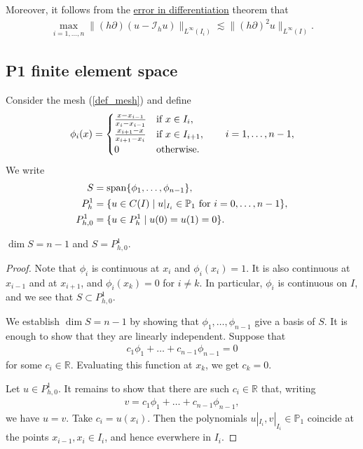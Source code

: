 \documentclass[12pt,oneside]{amsart}
\def\R{\mathbb R}
\def\I{\mathcal I}
\DeclareMathOperator{\linspan}{span}
\begin{document}
Moreover, it follows from the \href{https://nbviewer.org/github/uh-comp-methods1/notebooks/blob/main/interpolation/lecture.ipynb#Theorem:-error-in-differentiation}{error in differentiation} theorem that 
    \begin{align}\label{eq_err_in_diff}
\max_{i=1,\dots,n}\|(h\partial)(u - \I_h u)\|_{L^\infty(I_i)} \lesssim \|(h \partial)^2 u\|_{L^\infty(I)}.
    \end{align}

\subsection{P1 finite element space}

Consider the mesh (\ref{def_mesh}) and define 
    \begin{align}\label{def_P1_basis}
\phi_i(x) = \begin{cases}
\frac{x - x_{i-1}}{x_i - x_{i-1}} & \textnormal{if $x \in I_i$},
\\
\frac{x_{i+1} - x}{x_{i+1} - x_i} & \textnormal{if $x \in I_{i+1}$},
\\
0 & \textnormal{otherwise}.
\end{cases}
\qquad i = 1,\dots,n-1,
    \end{align}
We write
    \begin{align}\label{def_S}
S &= \linspan \{ \phi_1,\dots,\phi_{n-1} \},
\\\notag
P^1_{h} &= \{ u \in C(I) \mid \textnormal{$u|_{I_{i}} \in \mathbb P_1$ for $i=0,\dots,n-1$} \},
\\\notag
P^1_{h,0} &= \{ u \in P^1_{h} \mid u(0) = u(1) = 0 \}.
    \end{align}

\begin{lemma}
$\dim S = n-1$ and $S = P^1_{h,0}$.
\end{lemma}
\begin{proof}
Note that $\phi_i$ is continuous at $x_i$ and $\phi_i(x_i) = 1$.
It is also continuous at $x_{i-1}$ and at $x_{i+1}$,
and $\phi_i(x_k) = 0$ for $i \ne k$. In particular, $\phi_i$ is continuous on $I$, and we see that $S \subset P_{h,0}^1$.

We establish $\dim S = n - 1$ by showing that $\phi_1,\dots,\phi_{n-1}$ give a basis of $S$.
It is enough to show that they are linearly independent.
Suppose that 
    \begin{align*}
c_1 \phi_1 + \dots + c_{n-1} \phi_{n-1} = 0
    \end{align*}
for some $c_i \in \R$. Evaluating this function at $x_k$, we get 
$c_k = 0$.

Let $u \in P^1_{h,0}$. It remains to show that there are such $c_i \in \R$ that, writing
    \begin{align*}
v = c_1 \phi_1 + \dots + c_{n-1} \phi_{n-1},
    \end{align*}
we have $u = v$. 
Take $c_i = u(x_i)$. Then 
the polynomials
$u|_{I_i}, v|_{I_i} \in \mathbb P_1$ 
coincide at the points $x_{i-1}, x_i \in I_i$, and hence everwhere in $I_i$.
\end{proof}
\end{document}
